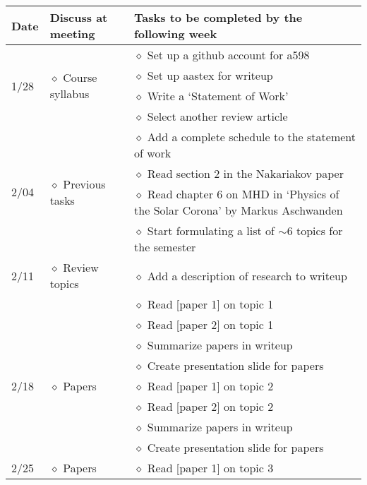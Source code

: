 \documentclass[12pt]{article}
\begin{document}
\begin{table}[ht]
    \centering
    \begin{tabular}{m{0.35in} m{1.5in} m{4.0in}}
    \textbf{Date}
        & \textbf{Discuss at meeting}
        & \textbf{Tasks to be completed by the following week}\\
    \hline\hline
    \multirow{4}{*}{1/28}
        & \multirow{4}{*}{$\diamond$ Course syllabus}
            & $\diamond$ Set up a github account for a598\\ 
            & & $\diamond$ Set up aastex for writeup\\
            & & $\diamond$ Write a `Statement of Work'\\
            & & $\diamond$ Select another review article\\
    \hline
    \multirow{4}{*}{2/04}
        & \multirow{4}{*}{$\diamond$ Previous tasks}
        & $\diamond$ Add a complete schedule to the statement of work\\
        & & $\diamond$ Read section 2 in the Nakariakov paper\\
        & & $\diamond$ Read chapter 6 on MHD in `Physics of the Solar
           Corona' by Markus Aschwanden\\
        & & $\diamond$ Start formulating a list of $\sim$6 topics
            for the semester\\
    \hline
    2/11 & $\diamond$ Review topics & 
            $\diamond$ Add a description of research to writeup\\
        & & $\diamond$ Read [paper 1] on topic 1\\
        & & $\diamond$ Read [paper 2] on topic 1\\
        & & $\diamond$ Summarize papers in writeup\\
        & & $\diamond$ Create presentation slide for papers\\
    \hline
    2/18 & $\diamond$ Papers & $\diamond$ Read [paper 1] on topic 2\\
        & & $\diamond$ Read [paper 2] on topic 2\\
        & & $\diamond$ Summarize papers in writeup\\
        & & $\diamond$ Create presentation slide for papers\\
    \hline
    2/25 & $\diamond$ Papers & $\diamond$ Read [paper 1] on topic 3\\

\end{tabular}
\end{table}
\end{document}
